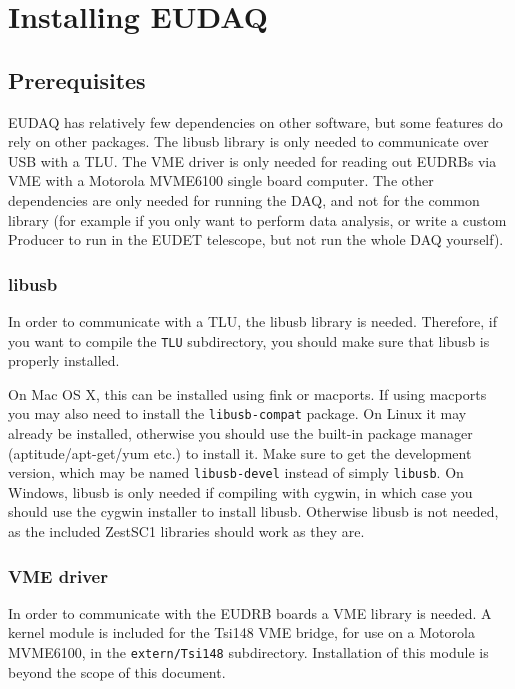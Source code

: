 \section{Installing EUDAQ}

\subsection{Prerequisites}
EUDAQ has relatively few dependencies on other software, but some features do rely on other packages.
The libusb library is only needed to communicate over USB with a \gls{TLU}\cite{Cussans2009}.
The VME driver is only needed for reading out \glspl{EUDRB}\cite{Cotta2008}
via VME with a Motorola MVME6100 single board computer.
The other dependencies are only needed for running the DAQ, and not for the common library
(for example if you only want to perform data analysis,
or write a custom Producer to run in the EUDET telescope,
but not run the whole DAQ yourself).

\subsubsection{libusb}
In order to communicate with a \gls{TLU}, the libusb library is needed.
Therefore, if you want to compile the \texttt{TLU} subdirectory, you should make sure that libusb is properly installed.

On Mac OS X, this can be installed using fink or macports.
If using macports you may also need to install the \texttt{libusb-compat} package.
On Linux it may already be installed,
otherwise you should use the built-in package manager (aptitude/apt-get/yum etc.) to install it.
Make sure to get the development version, which may be named \texttt{libusb-devel} instead of simply \texttt{libusb}.
On Windows, libusb is only needed if compiling with cygwin,
in which case you should use the cygwin installer to install libusb.
Otherwise libusb is not needed, as the included ZestSC1 libraries should work as they are.

\subsubsection{VME driver}
In order to communicate with the \gls{EUDRB} boards a VME library is needed.
A kernel module is included for the Tsi148 VME bridge,
for use on a Motorola MVME6100, in the \texttt{extern/Tsi148} subdirectory.
Installation of this module is beyond the scope of this document.

